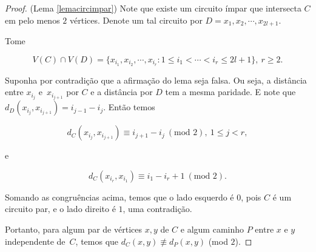 \begin{proof}(Lema \ref{lemacircimpar})
Note que existe um circuito ímpar que intersecta $C$ em pelo menos $2$ vértices. Denote um tal circuito por $D = x_1, x_2, \cdots, x_{2l+1}$.

Tome

\[V(C) \cap V(D) = \{x_{i_1}, x_{i_2}, \cdots, x_{i_r} : 1\leq i_1 < \cdots < i_r \leq 2l+1 \},\ r\geq 2.\]

Suponha por contradição que a afirmação do lema seja falsa. Ou seja, a distância entre $x_{i_j}$ e~$x_{i_{j+1}}$ por $C$ e a distância por $D$ tem a mesma paridade. E note que $d_D(x_{i_j}, x_{i_{j+1}}) = i_{j-1} - i_j$. Então temos

\[d_C(x_{i_j}, x_{i_{j+1}}) \equiv i_{j+1} - i_j\ (\text{mod } 2),\ 1\leq j< r,\]

e

\[d_C(x_{i_r}, x_{i_1}) \equiv i_1 - i_r + 1\ (\text{mod } 2).\]

Somando as congruências acima, temos que o lado esquerdo é $0$, pois $C$ é um circuito par, e o lado direito é $1$, uma contradição.

Portanto, para algum par de vértices $x,y$ de $C$ e algum caminho $P$ entre $x$ e $y$ independente de~$C$, temos que $d_C(x,y) \not\equiv d_P(x,y)$ (mod $2$).
\end{proof}

